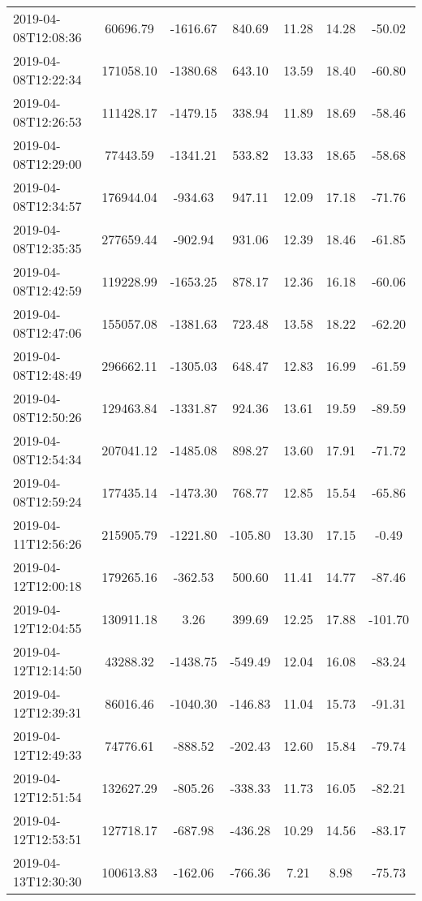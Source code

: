 \begin{table}
\begin{tabular}{lcccccc}
2019-04-08T12:08:36 &   60696.79 & -1616.67 &   840.69 &   11.28 &   14.28 &  -50.02 \\
2019-04-08T12:22:34 &  171058.10 & -1380.68 &   643.10 &   13.59 &   18.40 &  -60.80 \\
2019-04-08T12:26:53 &  111428.17 & -1479.15 &   338.94 &   11.89 &   18.69 &  -58.46 \\
2019-04-08T12:29:00 &   77443.59 & -1341.21 &   533.82 &   13.33 &   18.65 &  -58.68 \\
2019-04-08T12:34:57 &  176944.04 &  -934.63 &   947.11 &   12.09 &   17.18 &  -71.76 \\
2019-04-08T12:35:35 &  277659.44 &  -902.94 &   931.06 &   12.39 &   18.46 &  -61.85 \\
2019-04-08T12:42:59 &  119228.99 & -1653.25 &   878.17 &   12.36 &   16.18 &  -60.06 \\
2019-04-08T12:47:06 &  155057.08 & -1381.63 &   723.48 &   13.58 &   18.22 &  -62.20 \\
2019-04-08T12:48:49 &  296662.11 & -1305.03 &   648.47 &   12.83 &   16.99 &  -61.59 \\
2019-04-08T12:50:26 &  129463.84 & -1331.87 &   924.36 &   13.61 &   19.59 &  -89.59 \\
2019-04-08T12:54:34 &  207041.12 & -1485.08 &   898.27 &   13.60 &   17.91 &  -71.72 \\
2019-04-08T12:59:24 &  177435.14 & -1473.30 &   768.77 &   12.85 &   15.54 &  -65.86 \\
2019-04-11T12:56:26 &  215905.79 & -1221.80 &  -105.80 &   13.30 &   17.15 &   -0.49 \\
2019-04-12T12:00:18 &  179265.16 &  -362.53 &   500.60 &   11.41 &   14.77 &  -87.46 \\
2019-04-12T12:04:55 &  130911.18 &     3.26 &   399.69 &   12.25 &   17.88 & -101.70 \\
2019-04-12T12:14:50 &   43288.32 & -1438.75 &  -549.49 &   12.04 &   16.08 &  -83.24 \\
2019-04-12T12:39:31 &   86016.46 & -1040.30 &  -146.83 &   11.04 &   15.73 &  -91.31 \\
2019-04-12T12:49:33 &   74776.61 &  -888.52 &  -202.43 &   12.60 &   15.84 &  -79.74 \\
2019-04-12T12:51:54 &  132627.29 &  -805.26 &  -338.33 &   11.73 &   16.05 &  -82.21 \\
2019-04-12T12:53:51 &  127718.17 &  -687.98 &  -436.28 &   10.29 &   14.56 &  -83.17 \\
2019-04-13T12:30:30 &  100613.83 &  -162.06 &  -766.36 &    7.21 &    8.98 &  -75.73 \\
\bottomrule

\end{tabular}

\end{table}
